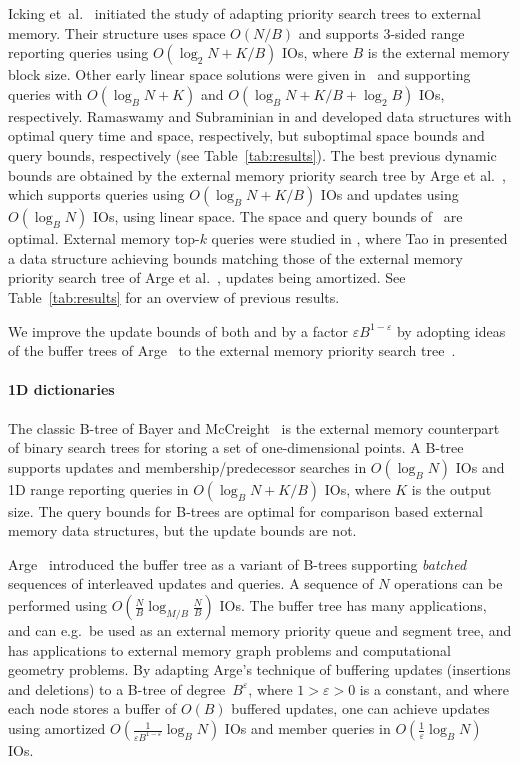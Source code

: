 \documentclass[11pt]{article}
\begin{document}
Icking et~al.~\cite{wg87iko} initiated the study of adapting priority
search trees to external memory.  Their structure uses space $O(N/B)$
and supports 3-sided range reporting queries using $O(\log_2 N+K/B)$
IOs, where $B$ is the external memory block size.  Other early linear
space solutions were given in~\cite{bg90} and \cite{krvv96} supporting
queries with $O(\log_B N+K)$ and $O(\log_B N+K/B+\log_2 B)$ IOs,
respectively.  Ramaswamy and Subraminian in \cite{pods94rs} and
\cite{soda95sr} developed data structures with optimal query time and
space, respectively, but suboptimal space bounds and query bounds,
respectively (see Table~\ref{tab:results}).  The best previous dynamic
bounds are obtained by the external memory priority search tree by
Arge et al.~\cite{pods99asv}, which supports queries using $O(\log_B
N+K/B)$ IOs and updates using $O(\log_B N)$ IOs, using linear
space. The space and query bounds of~\cite{pods99asv} are
optimal. External memory top-$k$ queries were studied in
\cite{soda11abz, pods12st,pods14t}, where Tao in \cite{pods14t}
presented a data structure achieving bounds matching those of the
external memory priority search tree of Arge et al.~\cite{pods99asv},
updates being amortized.  See Table~\ref{tab:results} for an overview
of previous results.

We improve the update bounds of both \cite{pods99asv} and
\cite{pods14t} by a factor $\varepsilon B^{1-\varepsilon}$ by adopting
ideas of the buffer trees of Arge~\cite{a03} to the external memory
priority search tree~\cite{pods99asv}.

\paragraph*{1D dictionaries}

The classic B-tree of Bayer and McCreight~\cite{bm72} is the external
memory counterpart of binary search trees for storing a set of
one-dimensional points. A B-tree supports updates and
membership/predecessor searches in $O(\log_B N)$ IOs and 1D range
reporting queries in $O(\log_B N+K/B)$ IOs, where $K$ is the output
size. The query bounds for B-trees are optimal for comparison based
external memory data structures, but the update bounds are not.

Arge~\cite{a03} introduced the buffer tree as a variant of B-trees
supporting \emph{batched} sequences of interleaved updates and
queries. A sequence of $N$ operations can be performed using
$O(\frac{N}{B}\log_{M/B} \frac{N}{B})$ IOs. The buffer tree has many
applications, and can e.g.\ be used as an external memory priority
queue and segment tree, and has applications to external memory graph
problems and computational geometry problems. By adapting Arge's
technique of buffering updates (insertions and deletions) to a B-tree
of degree~$B^{\varepsilon}$, where $1>\varepsilon>0$ is a constant,
and where each node stores a buffer of $O(B)$ buffered updates, one
can achieve updates using amortized $O(\frac{1}{\varepsilon
  B^{1-\varepsilon}}\log_B N)$ IOs and member queries in
$O(\frac{1}{\varepsilon}\log_B N)$ IOs.
\end{document}
